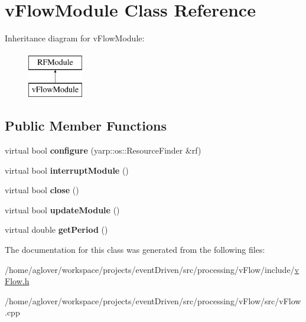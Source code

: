 \hypertarget{classvFlowModule}{\section{v\-Flow\-Module Class Reference}
\label{classvFlowModule}
}
Inheritance diagram for v\-Flow\-Module\-:\begin{figure}[H]
\begin{center}
\leavevmode
\includegraphics[height=2.000000cm]{classvFlowModule}
\end{center}
\end{figure}
\subsection*{Public Member Functions}
\begin{DoxyCompactItemize}
\item 
\hypertarget{classvFlowModule_a5cf91bc0de9e311b1946c6ec044fd947}{virtual bool {\bfseries configure} (yarp\-::os\-::\-Resource\-Finder \&rf)}\label{classvFlowModule_a5cf91bc0de9e311b1946c6ec044fd947}

\item 
\hypertarget{classvFlowModule_a49a90a2d595d99bf290423dd930eefe2}{virtual bool {\bfseries interrupt\-Module} ()}\label{classvFlowModule_a49a90a2d595d99bf290423dd930eefe2}

\item 
\hypertarget{classvFlowModule_a63a3da2ac7ba9631753ea244d8bc4358}{virtual bool {\bfseries close} ()}\label{classvFlowModule_a63a3da2ac7ba9631753ea244d8bc4358}

\item 
\hypertarget{classvFlowModule_a880de21f5c85d684f7c0999d0a84e26b}{virtual bool {\bfseries update\-Module} ()}\label{classvFlowModule_a880de21f5c85d684f7c0999d0a84e26b}

\item 
\hypertarget{classvFlowModule_a8f6f74c4a7888e162c2dff8a34a84323}{virtual double {\bfseries get\-Period} ()}\label{classvFlowModule_a8f6f74c4a7888e162c2dff8a34a84323}

\end{DoxyCompactItemize}


The documentation for this class was generated from the following files\-:\begin{DoxyCompactItemize}
\item 
/home/aglover/workspace/projects/event\-Driven/src/processing/v\-Flow/include/\hyperlink{vFlow_8h}{v\-Flow.\-h}\item 
/home/aglover/workspace/projects/event\-Driven/src/processing/v\-Flow/src/v\-Flow.\-cpp\end{DoxyCompactItemize}
